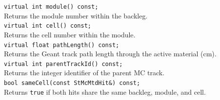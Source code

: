 \begin{Entry}
    \verb+virtual int module() const;+\\
    Returns the module number within the backleg.\\

    \verb+virtual int cell() const;+\\
    Returns the cell number within the module.\\

    \verb+virtual float pathLength() const;+\\
    Returns the Geant track path length through the active material (cm).\\

    \verb+virtual int parentTrackId() const;+\\
    Returns the integer identifier of the parent MC track.\\

    \verb+bool sameCell(const StMcMtdHit&) const;+\\
    Returns \texttt{true} if both hits share the same backleg,
    module, and cell.

\end{Entry}
\clearpage

%
%
